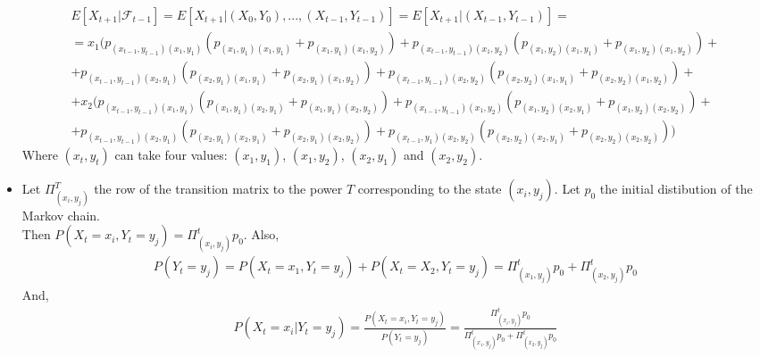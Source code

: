 \begin{itemize}
   \begin{gather*}
    E[X_{t+1}|\mathcal{F}_{t-1}] = E[X_{t+1}|(X_{0},Y_{0}),...,(X_{t-1},Y_{t-1})] = E[X_{t+1}|(X_{t-1},Y_{t-1})] = \\
    =x_{1}(p_{(x_{t-1},y_{t-1})(x_{1},y_{1})}(p_{(x_{1},y_{1})(x_{1},y_{1})}+p_{(x_{1},y_{1})(x_{1},y_{2})})+p_{(x_{t-1},y_{t-1})(x_{1},y_{2})}(p_{(x_{1},y_{2})(x_{1},y_{1})}+p_{(x_{1},y_{2})(x_{1},y_{2})})+\\
    +p_{(x_{t-1},y_{t-1})(x_{2},y_{1})}(p_{(x_{2},y_{1})(x_{1},y_{1})}+p_{(x_{2},y_{1})(x_{1},y_{2})})+p_{(x_{t-1},y_{t-1})(x_{2},y_{2})}(p_{(x_{2},y_{2})(x_{1},y_{1})}+p_{(x_{2},y_{2})(x_{1},y_{2})})+\\
    +x_{2}(p_{(x_{t-1},y_{t-1})(x_{1},y_{1})}(p_{(x_{1},y_{1})(x_{2},y_{1})}+p_{(x_{1},y_{1})(x_{2},y_{2})})+p_{(x_{t-1},y_{t-1})(x_{1},y_{2})}(p_{(x_{1},y_{2})(x_{2},y_{1})}+p_{(x_{1},y_{2})(x_{2},y_{2})})+\\
    +p_{(x_{t-1},y_{t-1})(x_{2},y_{1})}(p_{(x_{2},y_{1})(x_{2},y_{1})}+p_{(x_{2},y_{1})(x_{2},y_{2})})+p_{(x_{t-1},y_{1})(x_{2},y_{2})}(p_{(x_{2},y_{2})(x_{2},y_{1})}+p_{(x_{2},y_{2})(x_{2},y_{2})}))
    \end{gather*}
    Where $(x_t,y_t)$ can take four values: $(x_1,y_1)$, $(x_1,y_2)$, $(x_2,y_1)$ and $(x_2,y_2)$. \\

\item     
Let $\Pi^T_{(x_i, y_j)}$ the row of the transition matrix to the power $T$ corresponding to the state $(x_i,y_j)$. Let $p_0$ the initial distibution of the Markov chain.\\
Then $P(X_t = x_i, Y_t = y_j ) = \Pi^t_{(x_i,y_j)} p_0$. Also,
\begin{gather*}
    P(Y_t = y_j) = P(X_t = x_1, Y_t = y_j) + P(X_t= X_2, Y_t=y_j)
    =\Pi^t_{(x_1,y_j)} p_0 + \Pi^t_{(x_2,y_j)} p_0
\end{gather*}
And,
\begin{gather}
    P(X_t = x_i|Y_t = y_j) = \frac{P(X_t = x_i, Y_t = y_j )}{P(Y_t = y_j)} = \frac{\Pi^t_{(x_i,y_j)} p_0}{\Pi^t_{(x_1,y_j)} p_0 + \Pi^t_{(x_2,y_j)} p_0} 
\end{gather}


\end{itemize}
